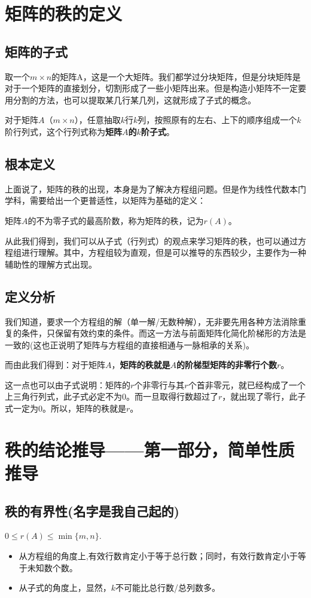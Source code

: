 \section{矩阵的秩的定义}
\subsection{矩阵的子式}
取一个$m\times n$的矩阵A，这是一个大矩阵。我们都学过分块矩阵，但是分块矩阵是对于一个矩阵的直接划分，切割形成了一些小矩阵出来。但是构造小矩阵不一定要用分割的方法，也可以提取某几行某几列，这就形成了子式的概念。
\begin{definition}
	对于矩阵$A$（$m\times n$），任意抽取$k$行$k$列，按照原有的左右、上下的顺序组成一个$k$阶行列式，这个行列式称为\textbf{矩阵$A$的$k$阶子式}。
\end{definition}
\subsection{根本定义}
上面说了，矩阵的秩的出现，本身是为了解决方程组问题。但是作为线性代数本门学科，需要给出一个更普适性，以矩阵为基础的定义：
\begin{definition}
	矩阵$A$的不为零子式的最高阶数，称为矩阵的秩，记为$r(A)$。
\end{definition}
从此我们得到，我们可以从子式（行列式）的观点来学习矩阵的秩，也可以通过方程组进行理解。其中，方程组较为直观，但是可以推导的东西较少，主要作为一种辅助性的理解方式出现。
\subsection{定义分析}
我们知道，要求一个方程组的解（单一解/无数种解），无非要先用各种方法消除重复的条件，只保留有效约束的条件。而这一方法与前面矩阵化简化阶梯形的方法是一致的(这也正说明了矩阵与方程组的直接相通与一脉相承的关系)。

而由此我们得到：对于矩阵$A$，\textbf{矩阵的秩就是$A$的阶梯型矩阵的非零行个数$r$}。

这一点也可以由子式说明：矩阵的$r$个非零行与其$r$个首非零元，就已经构成了一个上三角行列式，此子式必定不为0。而一旦取得行数超过了$r$，就出现了零行，此子式一定为0。所以，矩阵的秩就是$r$。

\section{秩的结论推导——第一部分，简单性质推导}
\subsection{秩的有界性(名字是我自己起的)}
\begin{property}
	$0\leq r(A)\leq \min\{m,n\}$.
\end{property}
\begin{remark}
	\begin{itemize}
		\item 从方程组的角度上,有效行数肯定小于等于总行数；同时，有效行数肯定小于等于未知数个数。
		\item 从子式的角度上，显然，$k$不可能比总行数/总列数多。
	\end{itemize}
\end{remark}

